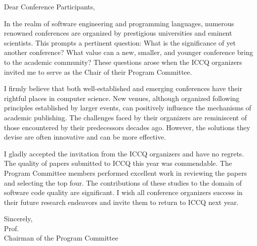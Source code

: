 \cleardoublepage
{}

Dear Conference Participants,

In the realm of software engineering and programming languages, numerous
renowned conferences are organized by prestigious universities and eminent
scientists. This prompts a pertinent question: What is the significance of yet
another conference? What value can a new, smaller, and younger conference bring
to the academic community? These questions arose when the ICCQ organizers
invited me to serve as the Chair of their Program Committee.

I firmly believe that both well-established and emerging conferences have their
rightful places in computer science. New venues, although organized following
principles established by larger events, can positively influence the
mechanisms of academic publishing. The challenges faced by their organizers are
reminiscent of those encountered by their predecessors decades ago. However,
the solutions they devise are often innovative and can be more effective.

I gladly accepted the invitation from the ICCQ organizers and have no regrets.
The quality of papers submitted to ICCQ this year was commendable. The Program
Committee members performed excellent work in reviewing the papers and
selecting the top four. The contributions of these studies to the domain of
software code quality are significant. I wish all conference organizers success
in their future research endeavors and invite them to return to ICCQ next
year.

\vspace{18pt}
Sincerely,\\
Prof. \\
Chairman of the Program Committee \\

